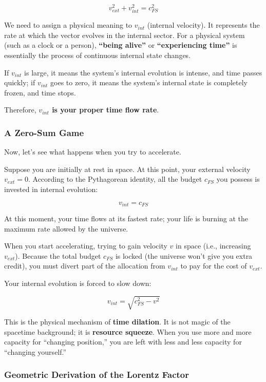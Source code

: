 \[v_{ext}^2 + v_{int}^2 = c_{FS}^2\]

We need to assign a physical meaning to $v_{int}$ (internal velocity). It represents the rate at which the vector evolves in the internal sector. For a physical system (such as a clock or a person), \textbf{``being alive''} or \textbf{``experiencing time''} is essentially the process of continuous internal state changes.

If $v_{int}$ is large, it means the system's internal evolution is intense, and time passes quickly; if $v_{int}$ goes to zero, it means the system's internal state is completely frozen, and time stops.

Therefore, \textbf{$v_{int}$ is your proper time flow rate}.

\subsubsection{A Zero-Sum Game}

Now, let's see what happens when you try to accelerate.

Suppose you are initially at rest in space. At this point, your external velocity $v_{ext} = 0$. According to the Pythagorean identity, all the budget $c_{FS}$ you possess is invested in internal evolution:

\[v_{int} = c_{FS}\]

At this moment, your time flows at its fastest rate; your life is burning at the maximum rate allowed by the universe.

When you start accelerating, trying to gain velocity $v$ in space (i.e., increasing $v_{ext}$). Because the total budget $c_{FS}$ is locked (the universe won't give you extra credit), you must divert part of the allocation from $v_{int}$ to pay for the cost of $v_{ext}$.

Your internal evolution is forced to slow down:

\[v_{int} = \sqrt{c_{FS}^2 - v^2}\]

This is the physical mechanism of \textbf{time dilation}. It is not magic of the spacetime background; it is \textbf{resource squeeze}. When you use more and more capacity for ``changing position,'' you are left with less and less capacity for ``changing yourself.''

\subsubsection{Geometric Derivation of the Lorentz Factor}

